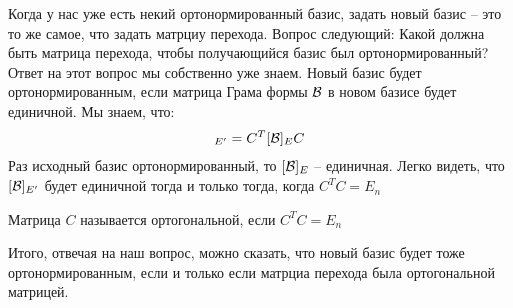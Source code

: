 Когда у нас уже есть некий ортонормированный базис, задать новый базис -- это то же самое, что задать матрциу перехода. Вопрос следующий: Какой должна быть 
матрица перехода, чтобы получающийся базис был ортонормированный? Ответ на этот вопрос мы собственно уже знаем.  
Новый базис будет ортонормированным, если матрица Грама формы $\mathcal{B}$ в новом базисе будет единичной. Мы знаем, что: 
\begin{gather*}
    [\B]_{E'} =C^T [\B]_E C
\end{gather*}
Раз исходный базис ортонормированный, то $[\mathcal{B}]_E$ -- единичная. Легко видеть, что $[\mathcal{B}]_{E'}$ будет единичной тогда и только тогда, когда $C^T C = E_n$ 
\begin{conj}
    Матрица $C$ называется ортогональной, если $C^T C = E_n$ 
\end{conj}
Итого, отвечая на наш вопрос, можно сказать, что новый базис будет тоже ортонормированным, если и только если матрциа перехода была ортогональной матрицей.
